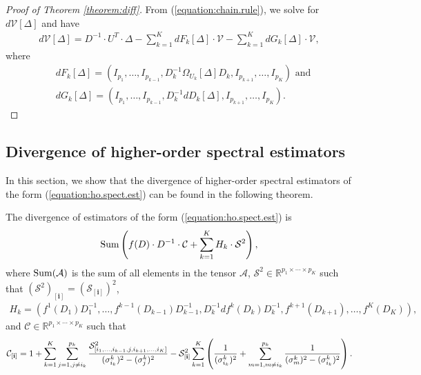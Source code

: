 \begin{proof}[Proof of Theorem \ref{theorem:diff}]
  From (\ref{equation:chain.rule}), we solve for
  $d\mathcal{V}[\Delta]$ and have
  \begin{align}
    \label{equation:d.V}
    d\mathcal{V}[\Delta] = D^{-1} \cdot U^T \cdot \Delta - \sum_{k=1}^K dF_k[\Delta]\cdot \mathcal{V} - \sum_{k=1}^K dG_k[\Delta] \cdot \mathcal{V},
  \end{align}
  where
  \begin{align}
    \label{equation:d.FG}
    &dF_k[\Delta] = (I_{p_1},\ldots,I_{p_{k-1}},D_k^{-1}\Omega_{U_k}[\Delta]D_k,I_{p_{k+1}},\ldots,I_{p_K}) \text{ and}\\
    &dG_k[\Delta] = (I_{p_1},\ldots,I_{p_{k-1}},D_k^{-1}dD_k[\Delta],I_{p_{k+1}},\ldots,I_{p_K}).
  \end{align}
\end{proof}

\subsection{Divergence of higher-order spectral estimators}
\label{subsection:div}
In this section, we show that the divergence of higher-order spectral
estimators of the form (\ref{equation:ho.spect.est}) can be found in
the following theorem.
\begin{theorem}
  The divergence of estimators of the form
  (\ref{equation:ho.spect.est}) is
\begin{align}
  \operatorname*{Sum}\left(f(D) \cdot D^{-1}\cdot \mathcal{C} + \sum_{k=1}^KH_k \cdot \mathcal{S}^2\right), \label{equation:divergence.final}
\end{align}
where $\operatorname*{Sum}(\mathcal{A})$ is the sum of all elements in the tensor
$\mathcal{A}$, $\mathcal{S}^2 \in \mathbb{R}^{p_1\times\cdots\times
  p_K}$ such that $(\mathcal{S}^2)_{[\mathbf{i}]} =
(\mathcal{S}_{[\mathbf{i}]})^2$,
\begin{align}
  \label{equation:H.k}
  H_k = (f^1(D_1)D_1^{-1},\ldots,f^{k-1}(D_{k-1})D_{k-1}^{-1},D_{k}^{-1}df^k(D_k)D_k^{-1},f^{k+1}(D_{k+1}),\ldots,f^K(D_K)),
\end{align}
and $\mathcal{C} \in \mathbb{R}^{p_1\times\cdots\times p_K}$ such that
\begin{align}
  \label{equation:C.array}
  \mathcal{C}_{[{\bf i}]} =  1 + \sum_{k=1}^K \sum_{j = 1, j\neq i_k}^{p_k} \frac{\mathcal{S}_{[i_1,\ldots,i_{k-1},j,i_{k+1},\ldots,i_K]}^2}{(\sigma_{i_k}^k)^2 - (\sigma_{j}^k)^2} - \mathcal{S}_{\bf [i]}^2\sum_{k=1}^K\left( \frac{1}{(\sigma_{i_k}^k)^2} + \sum_{m=1,m\neq i_k}^{p_k}\frac{1}{(\sigma_m^k)^2 - (\sigma_{i_k}^k)^2}  \right).
\end{align}
\end{theorem}

